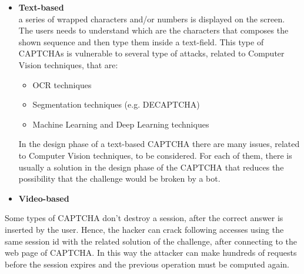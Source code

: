 \begin{itemize}
{}
\item{\textbf{Text-based}\\
a series of wrapped characters and/or numbers is displayed on the screen. The users needs to understand which are the characters that composes the shown sequence and then type them inside a text-field. This type of CAPTCHAs is vulnerable to several type of attacks, related to Computer Vision techniques, that are:
\begin{itemize}
\item{OCR techniques\cite{OCR}}
\item{Segmentation techniques (e.g. DECAPTCHA\cite{DECAPTCHA})}
\item{Machine Learning and Deep Learning techniques}
\end{itemize}
In the design phase of a text-based CAPTCHA there are many issues, related to Computer Vision techniques, to be considered. For each of them, there is usually a solution in the design phase of the CAPTCHA that reduces the possibility that the challenge would be broken by a bot\cite{DECAPTCHA}.}
\item{\textbf{Video-based}\\

}
\end{itemize}
Some types of CAPTCHA don't destroy a session, after the correct answer is inserted by the user\cite{text_audio}. Hence, the hacker can crack following accesses using the same session id with the related solution of the challenge, after connecting to the web page of CAPTCHA. In this way the attacker can make hundreds of requests before the session expires and the previous operation must be computed again.

